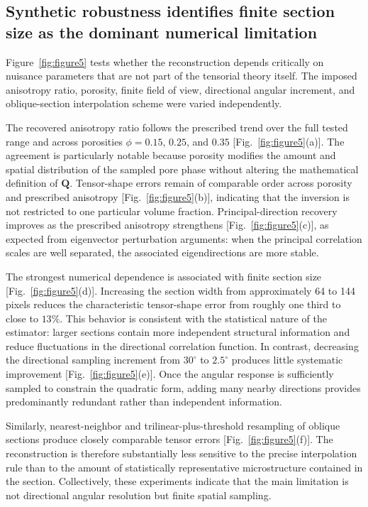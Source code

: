 \documentclass{article}
\begin{document}
\subsection{Synthetic robustness identifies finite section size as the dominant numerical limitation}
\label{sec:results_robustness}

Figure~\ref{fig:figure5} tests whether the reconstruction depends critically on nuisance parameters that are not part of the tensorial theory itself. The imposed anisotropy ratio, porosity, finite field of view, directional angular increment, and oblique-section interpolation scheme were varied independently.

The recovered anisotropy ratio follows the prescribed trend over the full tested range and across porosities $\phi=0.15$, $0.25$, and $0.35$ [Fig.~\ref{fig:figure5}(a)]. The agreement is particularly notable because porosity modifies the amount and spatial distribution of the sampled pore phase without altering the mathematical definition of $\mathbf{Q}$. Tensor-shape errors remain of comparable order across porosity and prescribed anisotropy [Fig.~\ref{fig:figure5}(b)], indicating that the inversion is not restricted to one particular volume fraction. Principal-direction recovery improves as the prescribed anisotropy strengthens [Fig.~\ref{fig:figure5}(c)], as expected from eigenvector perturbation arguments: when the principal correlation scales are well separated, the associated eigendirections are more stable.

The strongest numerical dependence is associated with finite section size [Fig.~\ref{fig:figure5}(d)]. Increasing the section width from approximately 64 to 144 pixels reduces the characteristic tensor-shape error from roughly one third to close to $13\%$. This behavior is consistent with the statistical nature of the estimator: larger sections contain more independent structural information and reduce fluctuations in the directional correlation function. In contrast, decreasing the directional sampling increment from $30^{\circ}$ to $2.5^{\circ}$ produces little systematic improvement [Fig.~\ref{fig:figure5}(e)]. Once the angular response is sufficiently sampled to constrain the quadratic form, adding many nearby directions provides predominantly redundant rather than independent information.

Similarly, nearest-neighbor and trilinear-plus-threshold resampling of oblique sections produce closely comparable tensor errors [Fig.~\ref{fig:figure5}(f)]. The reconstruction is therefore substantially less sensitive to the precise interpolation rule than to the amount of statistically representative microstructure contained in the section. Collectively, these experiments indicate that the main limitation is not directional angular resolution but finite spatial sampling.
\end{document}
